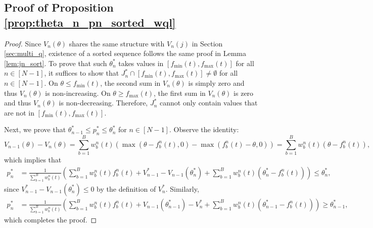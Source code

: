 \subsection{Proof of Proposition \ref{prop:theta_n_pn_sorted_wql}} \label{pf:theta_n_pn_sorted_wql}
\begin{proof}
Since $V_n(\theta)$ shares the same structure with $V_n(j)$ in Section \ref{sec:multi_q}, existence of a sorted sequence follows the same proof in Lemma \ref{lem:jn_sort}. To prove that such $\theta_n^*$ takes values in $[f_\text{min}(t), f_\text{max}(t)]$ for all $n \in [N-1]$, it suffices to show that $J_n^* \cap [f_\text{min}(t), f_\text{max}(t)] \neq \emptyset$ for all $n \in [N-1]$. On $\theta \leq f_\text{min}(t)$, the second sum in $V_n(\theta)$ is simply zero and thus $V_n(\theta)$ is non-increasing. On $\theta \geq f_\text{max}(t)$, the first sum in $V_n(\theta)$ is zero and thus $V_n(\theta)$ is non-decreasing. Therefore, $J_n^*$ cannot only contain values that are not in $[f_\text{min}(t), f_\text{max}(t)]$. \smallskip

Next, we prove that $\theta_{n-1}^* \leq p_n^* \leq \theta_n^*$ for $n \in [N-1]$. Observe the identity:
\[
V_{n-1}(\theta) - V_{n}(\theta) = \sum_{b=1}^B w_b^n(t) (\max(\theta - f_b^n(t), 0) - \max(f_b^n(t)-\theta, 0)) = \sum_{b=1}^B w_b^n(t) (\theta-f_b^n(t)),
\] 
which implies that 
\begin{align*}
p_n^* & = \frac{1}{\sum_{b=1}^B w_b^n(t)}\left( \sum_{b=1}^B w_b^n(t) f_b^n(t) + V_{n-1}^* - V_{n-1}(\theta_n^*) + \sum_{b=1}^B w_b^n(t) (\theta_n^* - f_b^n(t)) \right) \leq \theta_n^*,
\end{align*}
since $V_{n-1}^* - V_{n-1}(\theta_n^*) \leq 0$ by the definition of $V_n^*$. Similarly, 
\begin{align*}
    p_n^* & = \frac{1}{\sum_{b=1}^B w_b^n(t)}\left( \sum_{b=1}^B w_b^n(t) f_b^n(t) + V_{n-1}(\theta_{n-1}^*) - V_n^* + \sum_{b=1}^B w_b^n(t) (\theta_{n-1}^* - f_b^n(t)) \right) \geq \theta_{n-1}^*,
\end{align*}
which completes the proof.
\end{proof}



